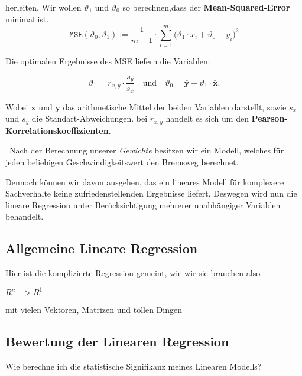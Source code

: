 herleiten. Wir wollen $\vartheta_1$ und $\vartheta_0$ so berechnen,dass der \textbf{Mean-Squared-Error} minimal ist. 
\begin{equation}
\label{eq:mse}
\mathtt{MSE}(\vartheta_0, \vartheta_1) := \frac{1}{m-1} \cdot \sum\limits_{i=1}^m \bigl(\vartheta_1 \cdot x_i + \vartheta_0 - y_i\bigr)^2
\end{equation}

Die optimalen Ergebnisse des MSE liefern die Variablen:

\begin{equation}
\label{eq:theta0}
\vartheta_1 = r_{x,y} \cdot \frac{s_y}{s_x} \quad \mbox{und} \quad \vartheta_0 = \bar{\mathbf{y}} - \vartheta_1 \cdot \bar{\mathbf{x}}.
\end{equation}

Wobei $\mathbf{x}$ und $\mathbf{y}$ das arithmetische Mittel der beiden Variablen darstellt, sowie $s_x$ und $s_y$ die Standart-Abweichungen. bei $r_{x,y}$ handelt es sich um den \textbf{Pearson-Korrelationskoeffizienten}. 

~\newline Nach der Berechnung unserer \textit{Gewichte} besitzen wir ein Modell, welches für jeden beliebigen Geschwindigkeitswert den Bremsweg berechnet. 

Dennoch können wir davon ausgehen, das ein lineares Modell für komplexere Sachverhalte keine zufriedenstellenden Ergebnisse liefert. Deswegen wird nun die lineare Regression unter Berücksichtigung mehrerer unabhängiger Variablen behandelt. 
\subsection{Allgemeine Lineare Regression}
Hier ist die komplizierte Regression gemeint, wie wir sie brauchen also

$R^n -> R^1$

mit vielen Vektoren, Matrizen und tollen Dingen

\subsection{Bewertung der Linearen Regression}
Wie berechne ich die statistische Signifikanz meines Linearen Modells?
